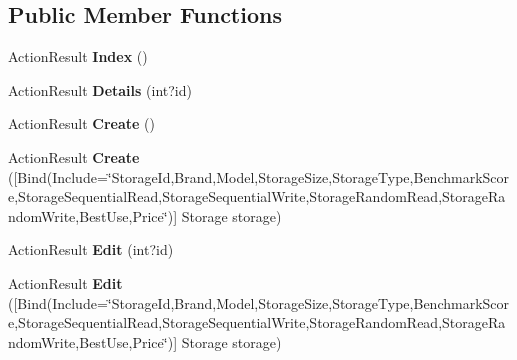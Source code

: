 \subsection*{Public Member Functions}
\begin{DoxyCompactItemize}
\item 
Action\+Result {\bfseries Index} ()\hypertarget{class_p_c_builder_m_v_c_1_1_controllers_1_1_storage_controller_a545a7718bc091a62a8616bc775db274b}{}\label{class_p_c_builder_m_v_c_1_1_controllers_1_1_storage_controller_a545a7718bc091a62a8616bc775db274b}

\item 
Action\+Result {\bfseries Details} (int?id)\hypertarget{class_p_c_builder_m_v_c_1_1_controllers_1_1_storage_controller_a4d127ebd20dad7db886ca02ebdf3de79}{}\label{class_p_c_builder_m_v_c_1_1_controllers_1_1_storage_controller_a4d127ebd20dad7db886ca02ebdf3de79}

\item 
Action\+Result {\bfseries Create} ()\hypertarget{class_p_c_builder_m_v_c_1_1_controllers_1_1_storage_controller_a066b849b419e238c561a2bfd1941d66f}{}\label{class_p_c_builder_m_v_c_1_1_controllers_1_1_storage_controller_a066b849b419e238c561a2bfd1941d66f}

\item 
Action\+Result {\bfseries Create} (\mbox{[}Bind(Include=\char`\"{}Storage\+Id,Brand,Model,Storage\+Size,Storage\+Type,Benchmark\+Score,Storage\+Sequential\+Read,Storage\+Sequential\+Write,Storage\+Random\+Read,Storage\+Random\+Write,Best\+Use,Price\char`\"{})\mbox{]} Storage storage)\hypertarget{class_p_c_builder_m_v_c_1_1_controllers_1_1_storage_controller_a2db58dc1d934110e60e558e4ee38fa21}{}\label{class_p_c_builder_m_v_c_1_1_controllers_1_1_storage_controller_a2db58dc1d934110e60e558e4ee38fa21}

\item 
Action\+Result {\bfseries Edit} (int?id)\hypertarget{class_p_c_builder_m_v_c_1_1_controllers_1_1_storage_controller_ac2c5d09f67d8b57ee5fcb692c641b81a}{}\label{class_p_c_builder_m_v_c_1_1_controllers_1_1_storage_controller_ac2c5d09f67d8b57ee5fcb692c641b81a}

\item 
Action\+Result {\bfseries Edit} (\mbox{[}Bind(Include=\char`\"{}Storage\+Id,Brand,Model,Storage\+Size,Storage\+Type,Benchmark\+Score,Storage\+Sequential\+Read,Storage\+Sequential\+Write,Storage\+Random\+Read,Storage\+Random\+Write,Best\+Use,Price\char`\"{})\mbox{]} Storage storage)\hypertarget{class_p_c_builder_m_v_c_1_1_controllers_1_1_storage_controller_a9997b8e8da2922dcc862fb7af42bd3b6}{}\label{class_p_c_builder_m_v_c_1_1_controllers_1_1_storage_controller_a9997b8e8da2922dcc862fb7af42bd3b6}


\end{DoxyCompactItemize}

